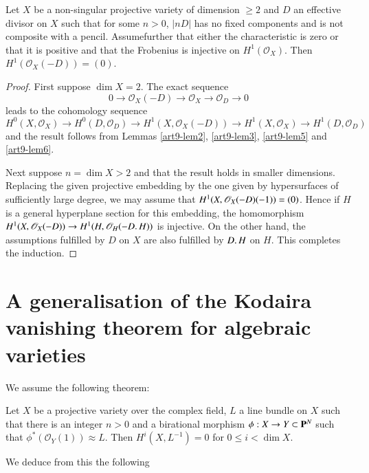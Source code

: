 \begin{theorem}\label{art9-thm2}%
Let $X$ be a non-singular projective variety of dimension $\geqslant 2$ and $D$ an effective divisor on $X$ such that for some $n>0$, $|nD|$ has no fixed components and is not composite with a pencil. Assume\pageoriginale further that either the characteristic is zero or that it is positive and that the Frobenius is injective on $H^1 (\mathscr{O}_X)$. Then $H^1 (\mathscr{O}_X (-D)) = (0)$.
\end{theorem}

\begin{proof}
First suppose $\dim X =2$. The exact sequence
$$
0 \to \mathscr{O}_X (-D) \to \mathscr{O}_X \to \mathscr{O}_D \to 0
$$
leads to the cohomology sequence
{\fontsize{10pt}{11pt}\selectfont
$$
H^0 (X, \mathscr{O}_X) \to H^0 (D,  \mathscr{O}_D) \to H^1
(X, \mathscr{O}_X (-D)) \to H^1 (X, \mathscr{O}_X) \to H^1
(D, \mathscr{O}_D) 
$$}
and the result follows from
 Lemmas \ref{art9-lem2}, \ref{art9-lem3}, \ref{art9-lem5}
 and \ref{art9-lem6}.

Next suppose $n = \dim X > 2$ and that the result holds in smaller
dimensions. Replacing the given projective embedding by the one given
by hypersurfaces of sufficiently large degree, we may assume that $H^1
(X,\\ \mathscr{O}_X (-D)(-1)) = (0)$. Hence if $H$ is a general
hyperplane section for this embedding, the homomorphism $H^1
(X, \mathscr{O}_X (-D)) \to H^1 (H, \mathscr{O}_H (- D \ldotp H))$ is
injective. On the other hand, the assumptions fulfilled by $D$ on $X$
are also fulfilled by $D \ldotp H$ on $H$. This  completes the
induction. 
\end{proof}

\section{A generalisation of the Kodaira vanishing theorem for 
algebraic varieties}\label{art9-sec4}
We assume the following theorem:

\begin{theorem*}
Let $X$ be a projective variety over the complex field, $L$ a line
bundle on $X$ such that there is an integer $n > 0$ and a birational
morphism $\phi: X \to Y \subset \mathbf{P}^N$ such that $\phi^*
(\mathscr{O}_Y (1)) \approx L$. Then $H^i (X, L^{-1}) = 0$ for
$0 \leqslant i < \dim X$. 
\end{theorem*}

We deduce from this the following 

